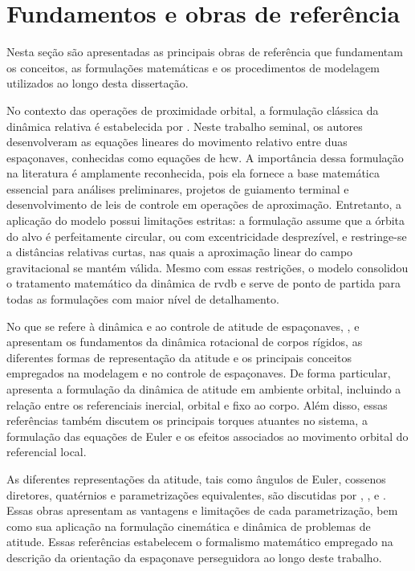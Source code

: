 \section{Fundamentos e obras de referência}
\label{sec_fundamentos_obras_referencia}

Nesta seção são apresentadas as principais obras de referência que fundamentam os conceitos, as formulações matemáticas e os procedimentos de modelagem utilizados ao longo desta dissertação.

No contexto das operações de proximidade orbital, a formulação clássica da dinâmica relativa é estabelecida por \cite{clohessy1960terminal}. 
Neste trabalho seminal, os autores desenvolveram as equações lineares do movimento relativo entre duas espaçonaves, conhecidas como equações de \gls{hcw}. 
A importância dessa formulação na literatura é amplamente reconhecida, pois ela fornece a base matemática essencial para análises preliminares, projetos de guiamento terminal e desenvolvimento de leis de controle em operações de aproximação.
Entretanto, a aplicação do modelo possui limitações estritas: a formulação assume que a órbita do alvo é perfeitamente circular, ou com excentricidade desprezível, e restringe-se a distâncias relativas curtas, nas quais a aproximação linear do campo gravitacional se mantém válida.
Mesmo com essas restrições, o modelo consolidou o tratamento matemático da dinâmica de \gls{rvdb} e serve de ponto de partida para todas as formulações com maior nível de detalhamento.

No que se refere à dinâmica e ao controle de atitude de espaçonaves, \cite{wie2008space}, \cite{hughes1986spacecraft} e \cite{wertz1978spacecraft} apresentam os fundamentos da dinâmica rotacional de corpos rígidos, as diferentes formas de representação da atitude e os principais conceitos empregados na modelagem e no controle de espaçonaves.
De forma particular, \cite{wie2008space} apresenta a formulação da dinâmica de atitude em ambiente orbital, incluindo a relação entre os referenciais inercial, orbital e fixo ao corpo. Além disso, essas referências também discutem os principais torques atuantes no sistema, a formulação das equações de Euler e os efeitos associados ao movimento orbital do referencial local.

As diferentes representações da atitude, tais como ângulos de Euler, cossenos diretores, quatérnios e parametrizações equivalentes, são discutidas por \cite{wertz1978spacecraft}, \cite{hughes1986spacecraft}, \cite{wie2008space} e \cite{junkins1986optimal}. Essas obras apresentam as vantagens e limitações de cada parametrização, bem como sua aplicação na formulação cinemática e dinâmica de problemas de atitude. Essas referências estabelecem o formalismo matemático empregado na descrição da orientação da espaçonave perseguidora ao longo deste trabalho.

